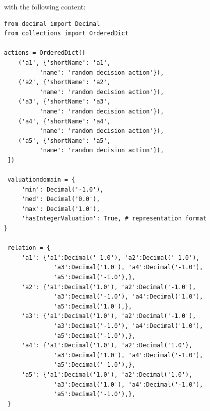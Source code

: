 with the following content:

\begin{lstlisting}[caption={A stored digraph instance},label=list:1.2]
from decimal import Decimal
from collections import OrderedDict

actions = OrderedDict([
    ('a1', {'shortName': 'a1',
          'name': 'random decision action'}),
    ('a2', {'shortName': 'a2',
          'name': 'random decision action'}),
    ('a3', {'shortName': 'a3',
          'name': 'random decision action'}),
    ('a4', {'shortName': 'a4',
          'name': 'random decision action'}),
    ('a5', {'shortName': 'a5',
          'name': 'random decision action'}),
 ])

 valuationdomain = {
     'min': Decimal('-1.0'),
     'med': Decimal('0.0'),
     'max': Decimal('1.0'),
     'hasIntegerValuation': True, # representation format
}

 relation = {
     'a1': {'a1':Decimal('-1.0'), 'a2':Decimal('-1.0'),
              'a3':Decimal('1.0'), 'a4':Decimal('-1.0'),
              'a5':Decimal('-1.0'),},
     'a2': {'a1':Decimal('1.0'), 'a2':Decimal('-1.0'),
              'a3':Decimal('-1.0'), 'a4':Decimal('1.0'),
              'a5':Decimal('1.0'),},
     'a3': {'a1':Decimal('1.0'), 'a2':Decimal('-1.0'),
              'a3':Decimal('-1.0'), 'a4':Decimal('1.0'),
              'a5':Decimal('-1.0'),},
     'a4': {'a1':Decimal('1.0'), 'a2':Decimal('1.0'),
              'a3':Decimal('1.0'), 'a4':Decimal('-1.0'),
              'a5':Decimal('-1.0'),},
     'a5': {'a1':Decimal('1.0'), 'a2':Decimal('1.0'),
              'a3':Decimal('1.0'), 'a4':Decimal('-1.0'),
              'a5':Decimal('-1.0'),},
 }
\end{lstlisting}

